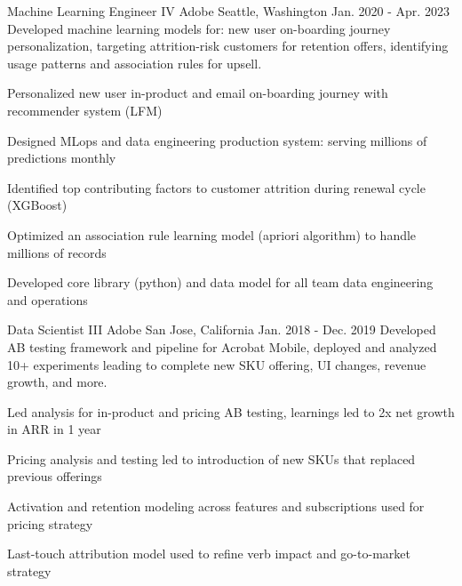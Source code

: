 

\begin{cventries}


\cventry
    {Machine Learning Engineer IV} %
    {Adobe} %
    {Seattle, Washington} %
    {Jan. 2020 - Apr. 2023} %
    {Developed machine learning models for: new user on-boarding journey personalization, targeting attrition-risk customers for retention offers, identifying usage patterns and association rules for upsell.} %
    {
      \begin{cvitems} %
        \item {Personalized new user in-product and email on-boarding journey with recommender system (LFM)}
        \item {Designed MLops and data engineering production system: serving millions of predictions monthly}
        \item {Identified top contributing factors to customer attrition during renewal cycle (XGBoost)}
        \item {Optimized an association rule learning model (apriori algorithm) to handle millions of records}
        \item {Developed core library (python) and data model for all team data engineering and operations}
      \end{cvitems}
    }

\cventry
    {Data Scientist III} %
    {Adobe} %
    {San Jose, California} %
    {Jan. 2018 - Dec. 2019} %
    {Developed AB testing framework and pipeline for Acrobat Mobile, deployed and analyzed 10+ experiments leading to complete new SKU offering, UI changes, revenue growth, and more.} %
    {
      \begin{cvitems} %
        \item {Led analysis for in-product and pricing AB testing, learnings led to 2x net growth in ARR in 1 year}
        \item {Pricing analysis and testing led to introduction of new SKUs that replaced previous offerings}
        \item {Activation and retention modeling across features and subscriptions used for pricing strategy}
        \item {Last-touch attribution model used to refine verb impact and go-to-market strategy}
      \end{cvitems}
    }


\end{cventries}
